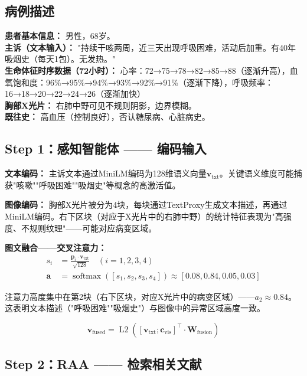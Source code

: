 \documentclass[11pt,a4paper]{ctexart}
\DeclareMathOperator{\softmax}{softmax}
\DeclareMathOperator{\Ltwo}{L2}
\begin{document}
\subsection{病例描述}

\begin{exambox}
\textbf{患者基本信息：} 男性，68岁。\\
\textbf{主诉（文本输入）：} "持续干咳两周，近三天出现呼吸困难，活动后加重。有40年吸烟史（每天1包）。无发热。"\\
\textbf{生命体征时序数据（72小时）：} 心率：72→75→78→82→85→88（逐渐升高），血氧饱和度：96\%→95\%→94\%→93\%→92\%→91\%（逐渐下降），呼吸频率：16→18→20→22→24→26（逐渐加快）\\
\textbf{胸部X光片：} 右肺中野可见不规则阴影，边界模糊。\\
\textbf{既往史：} 高血压（控制良好），否认糖尿病、心脏病史。
\end{exambox}

\subsection{Step 1：感知智能体 —— 编码输入}

\textbf{文本编码：} 主诉文本通过MiniLM编码为128维语义向量$\mathbf{v}_{\text{txt}}$。关键语义维度可能捕获"咳嗽""呼吸困难""吸烟史"等概念的高激活值。

\textbf{图像编码：} 胸部X光片被分为4块，每块通过TextProxy生成文本描述，再通过MiniLM编码。右下区块（对应于X光片中的右肺中野）的统计特征表现为"高强度、不规则纹理"——可能对应病变区域。

\textbf{图文融合——交叉注意力：}
\begin{align*}
s_i &= \frac{\mathbf{p}_i \cdot \mathbf{v}_{\text{txt}}}{\sqrt{128}} \quad (i=1,2,3,4) \\
\mathbf{a} &= \softmax([s_1, s_2, s_3, s_4]) \approx [0.08, 0.84, 0.05, 0.03]
\end{align*}

注意力高度集中在第2块（右下区块，对应X光片中的病变区域）——$a_2 \approx 0.84$。
这表明文本描述（"呼吸困难""吸烟史"）与图像中的异常区域高度一致。

$$\mathbf{v}_{\text{fused}} = \Ltwo\left([\mathbf{v}_{\text{txt}}; \mathbf{c}_{\text{vis}}]^\top \cdot \mathbf{W}_{\text{fusion}}\right)$$

\subsection{Step 2：RAA —— 检索相关文献}
\end{document}
